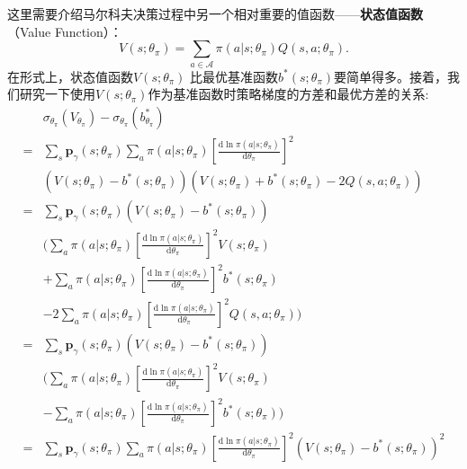 这里需要介绍马尔科夫决策过程中另一个相对重要的值函数——\textbf{状态值函数}（Value Function）：
\begin{equation}
    \label{equ:state-value-function}
    V(s; \theta_\pi) = \sum_{a \in \mathcal{A}} \pi(a \vert s; \theta_\pi) 
    Q(s, a; \theta_\pi).
\end{equation}
在形式上，状态值函数$V(s; \theta_\pi)$ 比最优基准函数$b^*(s;\theta_\pi)$要简单得多。接着，我们研究一下使用$V(s; \theta_\pi)$作为基准函数时策略梯度的方差和最优方差的关系:
\begin{align*}
    &\sigma_{\theta_\pi}(V_{\theta_\pi}) - \sigma_{\theta_\pi}(b^*_{\theta_\pi}) \\
    =& \sum_{s} \mathbf{p}_{\gamma}(s; \theta_\pi) \sum_{a} \pi(a \vert s; \theta_\pi)
        \left[\frac{\mathrm{d}\ln\pi(a \vert s; \theta_\pi)}
        {\mathrm{d}\theta_\pi}\right]^2 \\
        & (V(s; \theta_\pi) - b^*(s;\theta_\pi))
        (V(s; \theta_\pi) + b^*(s;\theta_\pi) - 2 Q(s, a; \theta_\pi)) \\
    =& \sum_{s} \mathbf{p}_{\gamma}(s; \theta_\pi)(V(s; \theta_\pi) - b^*(s;\theta_\pi)) \\
        &\bigg(\sum_{a} \pi(a \vert s; \theta_\pi)
        \left[\frac{\mathrm{d}\ln\pi(a \vert s; \theta_\pi)}
        {\mathrm{d}\theta_\pi}\right]^2V(s; \theta_\pi) \\
        & + \sum_{a} \pi(a \vert s; \theta_\pi)
        \left[\frac{\mathrm{d}\ln\pi(a \vert s; \theta_\pi)}
        {\mathrm{d}\theta_\pi}\right]^2 b^*(s;\theta_\pi) \\
        & - 2 \sum_{a} \pi(a \vert s; \theta_\pi)
        \left[\frac{\mathrm{d}\ln\pi(a \vert s; \theta_\pi)}
        {\mathrm{d}\theta_\pi}\right]^2Q(s, a; \theta_\pi)\bigg) \\
    =& \sum_{s} \mathbf{p}_{\gamma}(s; \theta_\pi)(V(s; \theta_\pi) - b^*(s;\theta_\pi)) \\
        &\bigg(\sum_{a} \pi(a \vert s; \theta_\pi)
        \left[\frac{\mathrm{d}\ln\pi(a \vert s; \theta_\pi)}
        {\mathrm{d}\theta_\pi}\right]^2V(s; \theta_\pi) \\
        & - \sum_{a} \pi(a \vert s; \theta_\pi)
        \left[\frac{\mathrm{d}\ln\pi(a \vert s; \theta_\pi)}
        {\mathrm{d}\theta_\pi}\right]^2 b^*(s;\theta_\pi) \bigg)\\
    =& \sum_{s} \mathbf{p}_{\gamma}(s; \theta_\pi) \sum_{a} \pi(a \vert s; \theta_\pi)
        \left[\frac{\mathrm{d}\ln\pi(a \vert s; \theta_\pi)}{\mathrm{d}\theta_\pi}\right]^2 
        (V(s; \theta_\pi) - b^*(s;\theta_\pi))^2\\

\end{align*}
